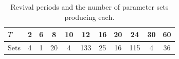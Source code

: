 \begin{table}[htbp]
  \centering
  \caption{Revival periods and the number of parameter sets producing
           each.}
  \label{tab:results-1}
  \begin{tabular}{lcccccccccc}
    \toprule
    $T$ & 2 & 6 & 8 & 10 & 12 & 16 & 20 & 24 & 30 & 60 \\
    \midrule
    Sets & 4 & 1 & 20 & 4 & 133 & 25 & 16 & 115 & 4 & 36 \\
    \bottomrule
  \end{tabular}
\end{table}
